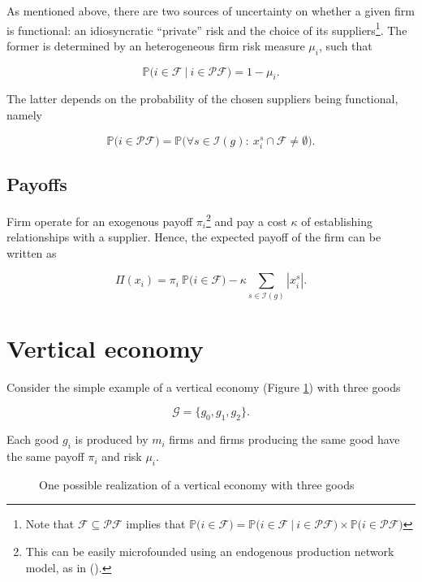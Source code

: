 \documentclass[american, abstract=on]{scrartcl}
\newcommand{\inputTikZ}[2]{%
      \scalebox{#1}{}  
    }
\newcommand{\F}{\mathcal{F}}
\newcommand{\G}{\mathcal{G}}
\newcommand{\I}{\mathcal{I}}
\newcommand{\PF}{\mathcal{P} \F}
\renewcommand{\P}{\mathbb{P}}
\newcommand{\abs}[1]{\left\lvert#1\right\rvert}
\newcommand{\citein}[1]{\citeauthor{#1} (\citeyear{#1})}
\begin{document}
As mentioned above, there are two sources of uncertainty on whether a given firm is functional: an idiosyncratic ``private'' risk and the choice of its suppliers\footnote{Note that $\F \subseteq \PF$ implies that $\P\Big(i \in \F \Big) = \P\Big(i \in \F \ \vert \ i \in \PF \Big) \times \P\Big( i \in \PF \Big)$}. The former is determined by an heterogeneous firm risk measure $\mu_i$, such that  

\begin{equation}
  \P\Big(i \in \F \ \vert \ i \in \PF \Big) = 1 - \mu_i.
\end{equation}

The latter depends on the probability of the chosen suppliers being functional, namely

\begin{equation}
  \P\Big( i \in \PF \Big) = \P\Big( \forall s \in \I(g): \ x_i^s \cap \F \neq \emptyset \Big).
\end{equation}

\subsection{Payoffs}

Firm operate for an exogenous payoff $\pi_i$\footnote{This can be easily microfounded using an endogenous production network model, as in \citein{acemoglu_endogenous_2020}.} and pay a cost $\kappa$ of establishing relationships with a supplier. Hence, the expected payoff of the firm can be written as

\begin{equation}
  \Pi(x_i) = \pi_i \ \P\Big( i \in \F \Big) - \kappa \sum_{s \in \I(g)} \abs{x^s_i}.
\end{equation}

\section{Vertical economy}

Consider the simple example of a vertical economy (Figure \ref{fig:vertical}) with three goods

\begin{equation}
  \G = \{g_0, g_1, g_2\}.
\end{equation}

Each good $g_i$ is produced by $m_i$ firms and firms producing the same good have the same payoff $\pi_i$ and risk $\mu_i$.

\begin{figure}[H]
  \centering
  \inputTikZ{0.7}{diagrams/vertical-economy.tikz} 
  \caption{One possible realization of a vertical economy with three goods}
  \label{fig:vertical}
\end{figure}
\end{document}
